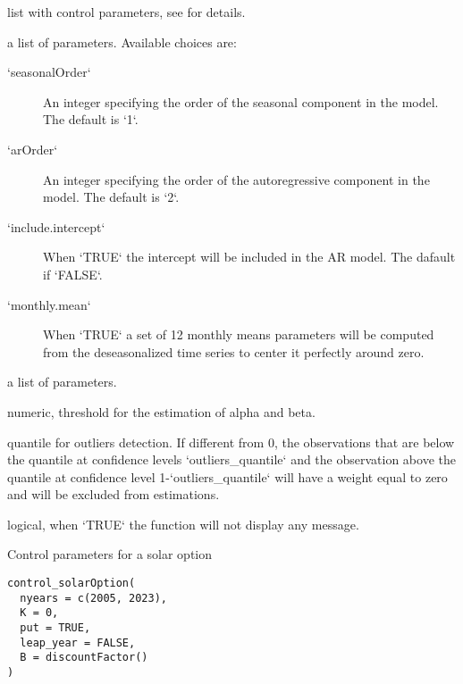 \documentclass[a4paper]{book}
\begin{document}
\begin{Arguments}
\begin{ldescription}
\item[\code{clearsky.model}] list with control parameters, see  for details.

\item[\code{mean.model}] a list of parameters. Available choices are:
\begin{description}

\item[`seasonalOrder`] An integer specifying the order of the seasonal component in the model. The default is `1`.
\item[`arOrder`] An integer specifying the order of the autoregressive component in the model. The default is `2`.
\item[`include.intercept`] When `TRUE` the intercept will be included in the AR model. The dafault if `FALSE`.
\item[`monthly.mean`] When `TRUE` a set of 12 monthly means parameters will be computed from the deseasonalized time series to center it perfectly around zero.

\end{description}


\item[\code{variance.model}] a list of parameters.

\item[\code{threshold}] numeric, threshold for the estimation of alpha and beta.

\item[\code{outliers\_quantile}] quantile for outliers detection. If different from 0, the observations that are below the quantile at confidence levels `outliers\_quantile` and
the observation above the quantile at confidence level 1-`outliers\_quantile` will have a weight equal to zero and will be excluded from estimations.

\item[\code{quiet}] logical, when `TRUE` the function will not display any message.
\end{ldescription}
\end{Arguments}
%
\begin{Description}\relax
Control parameters for a solar option
\end{Description}
%
\begin{Usage}
\begin{verbatim}
control_solarOption(
  nyears = c(2005, 2023),
  K = 0,
  put = TRUE,
  leap_year = FALSE,
  B = discountFactor()
)
\end{verbatim}
\end{Usage}
\end{document}
